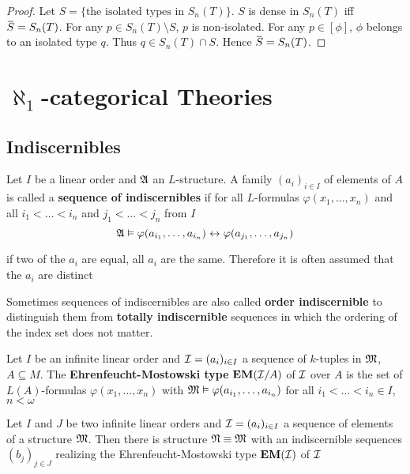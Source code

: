 \documentclass[11pt]{article}
\def \EM {\textbf{EM}}
\begin{document}
\begin{proof}
Let \(S=\{\text{the isolated types in }S_n(T)\}\). \(S\) is dense in \(S_n(T)\)
iff \(\barS=S_n(T)\). For any \(p\in S_n(T)\setminus S\), \(p\) is non-isolated. For any \(p\in[\phi]\), \(\phi\)
belongs to an isolated type \(q\). Thus \(q\in S_n(T)\cap S\). Hence \(\barS=S_n(T)\).
\end{proof}



\section{\texorpdfstring{\(\aleph_1\)}{ℵ₁}-categorical Theories}
\label{sec:org08185ef}

\subsection{Indiscernibles}
\label{sec:org3c0ca0f}
\begin{definition}[]
Let \(I\) be a linear order and \(\mathfrak{A}\) an \(L\)-structure. A family \((a_i)_{i\in I}\) of elements
of \(A\) is called a \textbf{sequence of indiscernibles}  if for all \(L\)-formulas \(\varphi(x_1,\dots,x_n)\) and
all \(i_1<\dots<i_n\) and \(j_1<\dots<j_n\) from \(I\)
\begin{equation*}
\mathfrak{A}\vDash\varphi(a_{i_1},\dots,a_{i_n})\leftrightarrow\varphi(a_{j_1},\dots,a_{j_n})
\end{equation*}
\end{definition}

if two of the \(a_i\) are equal, all \(a_i\) are the same. Therefore it is often assumed that
the \(a_i\) are distinct

Sometimes sequences of indiscernibles are also called \textbf{order indiscernible} to distinguish them
from \textbf{totally indiscernible} sequences in which the ordering of the index set does not matter.

\begin{definition}[]
Let \(I\) be an infinite linear order and \(\mathcal{I}=(a_i)_{i\in I}\) a sequence of \(k\)-tuples
in \(\mathfrak{M}\), \(A\subseteq M\). The \textbf{Ehrenfeucht-Mostowski type} \(\EM(\cali/A)\) of \(\mathcal{I}\) over \(A\) is the set
of \(L(A)\)-formulas \(\varphi(x_1,\dots,x_n)\) with \(\mathfrak{M}\vDash\varphi(a_{i_1},\dots,a_{i_n})\) for all \(i_1<\dots<i_n\in I\), \(n<\omega\)
\end{definition}

\begin{lemma}
\label{lemma5.1.3}
Let \(I\) and \(J\) be two infinite linear orders and \(\mathcal{I}=(a_i)_{i\in I}\) a sequence of elements
of a structure \(\mathfrak{M}\). Then there is structure \(\mathfrak{N}\equiv\mathfrak{M}\) with an indiscernible
sequences \((b_j)_{j\in J}\) realizing the Ehrenfeucht-Mostowski type \(\EM(\cali)\) of \(\mathcal{I}\)
\end{lemma}
\end{document}
